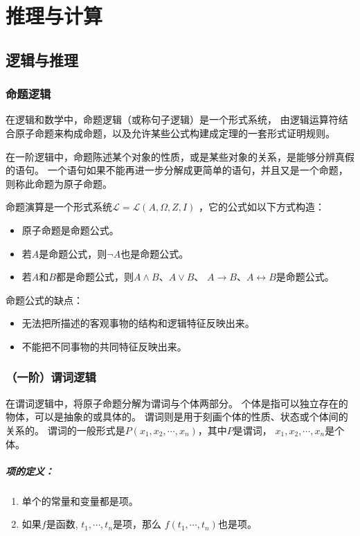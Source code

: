 \chapter{推理与计算}

\section{逻辑与推理}
\def\PLang{\mathcal{L}}
\subsection{命题逻辑}
在逻辑和数学中，命题逻辑（或称句子逻辑）是一个形式系统，
由逻辑运算符结合原子命题来构成命题，以及允许某些公式构建成定理的一套形式证明规则。

在一阶逻辑中，命题陈述某个对象的性质，或是某些对象的关系，是能够分辨真假的语句。
一个语句如果不能再进一步分解成更简单的语句，并且又是一个命题，则称此命题为原子命题。

命题演算是一个形式系统$\PLang = \PLang(A, \Omega, Z, I)$
，它的公式如以下方式构造：
\begin{itemize}
  \item 原子命题是命题公式。
  \item 若$A$是命题公式，则$\lnot A$也是命题公式。
  \item 若$A$和$B$都是命题公式，则$A \land B$、$A \lor B$、
    $A \rightarrow B$、$A \leftrightarrow B$是命题公式。
\end{itemize}

命题公式的缺点：
\begin{itemize}
  \item 无法把所描述的客观事物的结构和逻辑特征反映出来。
  \item 不能把不同事物的共同特征反映出来。
\end{itemize}

\subsection{（一阶）谓词逻辑}
在谓词逻辑中，将原子命题分解为谓词与个体两部分。
个体是指可以独立存在的物体，可以是抽象的或具体的。
谓词则是用于刻画个体的性质、状态或个体间的关系的。
谓词的一般形式是$P(x_1, x_2, \cdots, x_n)$，其中$P$是谓词，
$x_1,x_2,\cdots,x_n$是个体。

\paragraph{项的定义：}
\begin{enumerate}
  \item 单个的常量和变量都是项。
  \item 如果$f$是函数, $t_1, \cdots, t_n$是项，那么
    $f(t_1, \cdots, t_n)$也是项。
\end{enumerate}

